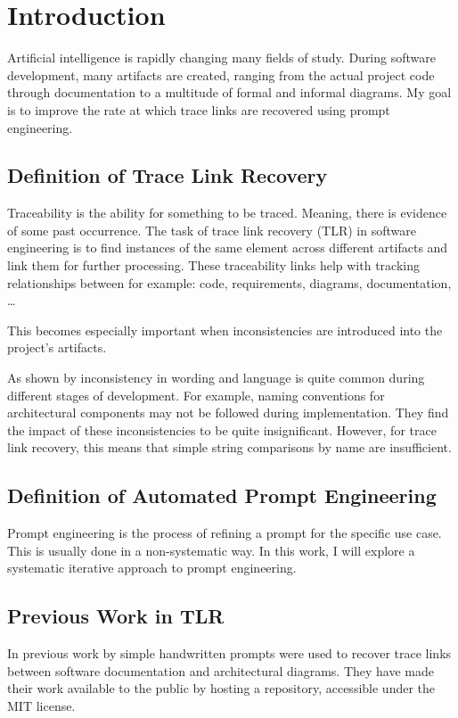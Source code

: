 
\chapter{Introduction}
\label{ch:Introduction}

Artificial intelligence is rapidly changing many fields of study.
During software development, many artifacts are created, ranging from the actual project code through documentation to a multitude of formal and informal diagrams. My goal is to improve the rate at which trace links are recovered using prompt engineering.

\section{Definition of Trace Link Recovery}
Traceability is the ability for something to be traced. Meaning, there is evidence of some past occurrence. %
The task of trace link recovery (TLR) in software engineering is to find instances of the same element across different artifacts and link them for further processing. These traceability links help with tracking relationships between for example: code, requirements, diagrams, documentation, \dots

This becomes especially important when inconsistencies are introduced into the project's artifacts. 

As shown by \citeauthor{wohlrab2019improving} \cite{wohlrab2019improving} inconsistency in wording and language is quite common during different stages of development. For example, naming conventions for architectural components may not be followed during implementation. They find the impact of these inconsistencies to be quite insignificant. However, for trace link recovery, this means that simple string comparisons by name are insufficient.



\section{Definition of Automated Prompt Engineering}
Prompt engineering is the process of refining a prompt for the specific use case. This is usually done in a non-systematic way. In this work, I will explore a systematic iterative approach to prompt engineering.

\section{Previous Work in TLR}
In previous work by 
simple handwritten prompts were used to recover trace links between software documentation and architectural diagrams. They have made their work available to the public by hosting a repository, accessible under the MIT license. 